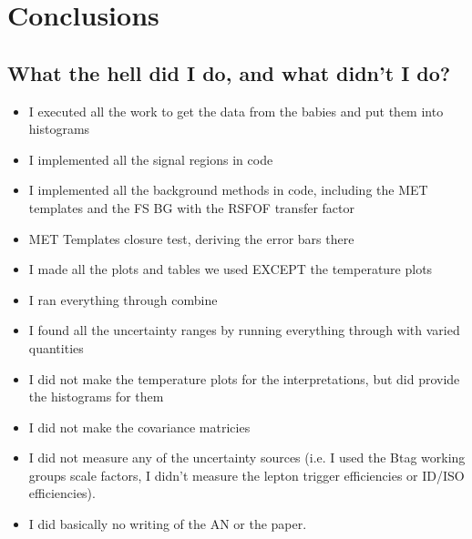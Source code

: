 \chapter{Conclusions}

\section{What the hell did I do, and what didn't I do?}

\begin{itemize}
  \item I executed all the work to get the data from the babies and put them into histograms
  \item I implemented all the signal regions in code
  \item I implemented all the background methods in code, including the MET templates and the FS BG with the RSFOF transfer factor
  \item MET Templates closure test, deriving the error bars there 
  \item I made all the plots and tables we used EXCEPT the temperature plots
  \item I ran everything through combine
  \item I found all the uncertainty ranges by running everything through with varied quantities
\end{itemize}

\begin{itemize}
  \item I did not make the temperature plots for the interpretations, but did provide the histograms for them
  \item I did not make the covariance matricies
  \item I did not measure any of the uncertainty sources (i.e. I used the Btag working groups scale factors, I didn't measure the lepton trigger efficiencies or ID/ISO efficiencies).
  \item I did basically no writing of the AN or the paper.
\end{itemize}
